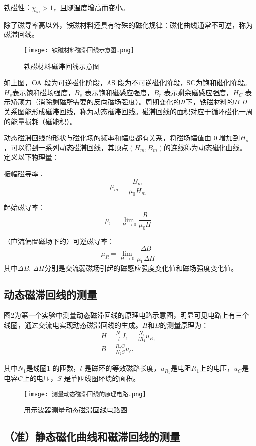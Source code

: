 \documentclass[11pt]{article}
\begin{document}
铁磁性：$\chi_m > 1$，且随温度增高而变小。

除了磁导率高以外，铁磁材料还具有特殊的磁化规律：磁化曲线通常不可逆，称为磁滞回线。

\begin{figure}[H]
	\centering
	\texttt{[image: 铁磁材料磁滞回线示意图.png]}
	\caption{铁磁材料磁滞回线示意图}
\end{figure}

如上图，OA 段为可逆磁化阶段，AS 段为不可逆磁化阶段，SC为饱和磁化阶段。$H_s$表示饱和磁场强度，$B_s$ 表示饱和磁感应强度，$B_r$ 表示剩余磁感应强度，$H_C$ 表示矫顽力（消除剩磁所需要的反向磁场强度）。周期变化的$H$下，铁磁材料的$B$-$H$关系图能形成磁滞回线，称为动态磁滞回线。磁滞回线的面积对应于循环磁化一周的能量损耗（磁能积）。

动态磁滞回线的形状与磁化场的频率和幅度都有关系，将磁场幅值由 $0$ 增加到$H_s$，可以得到一系列动态磁滞回线，其顶点$(H_m, B_m)$的连线称为动态磁化曲线。定义以下物理量：

振幅磁导率：
\[
\mu_m = \frac{B_m}{\mu_0H_m}
\]

起始磁导率：
\[
\mu_i = \lim_{H\rightarrow 0}\frac{B}{\mu_{0}H}
\]

（直流偏置磁场下的）可逆磁导率：
\[
\mu_R = \lim_{H\rightarrow 0}\frac{\Delta B}{\mu_{0}\Delta H}
\]
其中$\Delta B$, $\Delta H$分别是交流弱磁场引起的磁感应强度变化值和磁场强度变化值。

\subsection{动态磁滞回线的测量}

图2为第一个实验中测量动态磁滞回线的原理电路示意图，明显可见电路上有三个线圈，通过交流电实现动态磁滞回线的生成。$H$和$B$的测量原理为：
\begin{gather*}
	H = \frac{N_1}{l}I_1 = \frac{N_1}{l R_1}u_{R_1}\\
	B = \frac{R_2 C}{N_2 S}u_C
\end{gather*}

其中$N_1$是线圈1 的匝数，$l$ 是磁环的等效磁路长度，$u_{R_1}$是电阻$R_1$上的电压，$u_{C}$是电容$C$上的电压，$S$ 是单匝线圈环绕的面积。

\begin{figure}[H]
    \centering
    \texttt{[image: 测量动态磁滞回线的原理电路.png]}
    \caption{用示波器测量动态磁滞回线电路图}
\end{figure}

\subsection{（准）静态磁化曲线和磁滞回线的测量}
\end{document}
